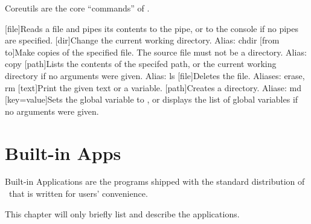 Coreutils are the core ``commands'' of \thedos.

\begin{outline}
\1[file]{Reads a file and pipes its contents to the pipe, or to the console if no pipes are specified.}
\1[dir]{Change the current working directory. Alias: chdir}
\1
\1[from to]{Make copies of the specified file. The source file must not be a directory. Alias: copy}
\1
\1[path]{Lists the contents of the specifed path, or the current working directory if no arguments were given. Alias: ls}
\1[file]{Deletes the file. Aliases: erase, rm}
\1[text]{Print the given text or a variable.}
\1
\1[path]{Creates a directory. Aliase: md}
\1
\1[key=value]{Sets the global variable  to , or displays the list of global variables if no arguments were given.}
\1
\end{outline}



\chapter{Built-in Apps}

Built-in Applications are the programs shipped with the standard distribution of \thedos\ that is written for users' convenience.

This chapter will only briefly list and describe the applications.

